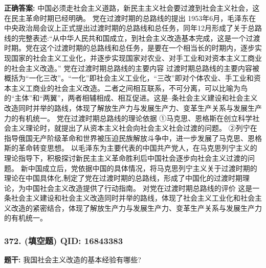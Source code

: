 \documentclass[12pt,UTF8]{ctexart}
\begin{document}
\textbf{正确答案:}
中国必须走社会主义道路，新民主主义社会要过渡到社会主义社会，这在民主革命时期已经明确。
党在过渡时期的总路线的提出
1953年6月，毛泽东在中央政治局会议上正式提出过渡时期的总路线和总任务，同年12月形成了关于总路线的完整表述:“从中华人民共和国成立，到社会主义改造基本完成，这是一个过渡时期。党在这个过渡时期的总路线和总任务，是要在一个相当长的时期内，逐步实现国家的社会主义工业化，并逐步实现国家对农业、对手工业和对资本主义工商业的社会主义改造。”
党在过渡时期总路线的主要内容
过渡时期总路线的主要内容被概括为“一化三改”。“一化”即社会主义工业化，“三改”即对个体农业、手工业和资本主义工商业的社会主义改造。二者之间相互联系，不可分离，可以比喻为鸟的“主体”和“两翼”，两者相辅相成、相互促进。这是--条社会主义建设和社会主义改造同时并举的路线，体现了解放生产力与发展生产力、变革生产关系与发展生产力的有机统一。
党在过渡时期总路线的理论依据
①马克思、恩格斯在创立科学社会主义理论时，就提出了从资本主义社会向社会主义社会过渡的问题。
②列宁在指导俄国无产阶级革命和世界被压迫民族解放斗争中，进一步发展了马克思、恩格斯的革命转变思想。
以毛泽东为主要代表的中国共产党人，在马克思列宁主义的理论指导下，积极探讨新民主主义革命胜利后中国社会逐步向社会主义过渡的问题。
新中国成立后，党依据中国的具体情况，将马克思列宁主义关于过渡时期的理论在中国具体化,制定了党在过渡时期的总路线，形成了中国化的过渡时期理论，为中国社会主义改造提供了行动指南。
对党在过渡时期总路线的评价
这是一条社会主义建设和社会主义改造同时并举的路线，体现了社会主义工业化和社会主义改造的紧密结合，体现了解放生产力与发展生产力、变革生产关系与发展生产力的有机统一。

\vspace{0.3em}\hrulefill\vspace{0.7em}

\subsubsection*{372. (填空题) \small QID: 16843383}

\textbf{题干:}
我国社会主义改造的基本经验有哪些?
\end{document}
